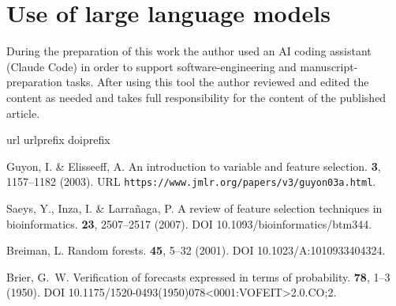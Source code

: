 \documentclass[fleqn,10pt]{wlscirep}
\begin{document}
\section*{Use of large language models}
During the preparation of this work the author used an AI coding assistant (Claude Code) in order to
support software-engineering and manuscript-preparation tasks. After using this tool the author
reviewed and edited the content as needed and takes full responsibility for the content of the
published article.

\begin{thebibliography}{10}
\expandafter\ifx\csname url\endcsname\relax
  \def\url#1{\texttt{#1}}\fi
\expandafter\ifx\csname urlprefix\endcsname\relax\def\urlprefix{URL }\fi
\expandafter\ifx\csname doiprefix\endcsname\relax\def\doiprefix{DOI }\fi
\providecommand{\bibinfo}[2]{#2}
\providecommand{\eprint}[2][]{\url{#2}}

\bibinfo{author}{Guyon, I.} \& \bibinfo{author}{Elisseeff, A.}
\newblock \bibinfo{journal}{\bibinfo{title}{An introduction to variable and
  feature selection}}.
  \textbf{\bibinfo{volume}{3}}, \bibinfo{pages}{1157--1182}
  (\bibinfo{year}{2003}).
\newblock \urlprefix\url{https://www.jmlr.org/papers/v3/guyon03a.html}.

\bibinfo{author}{Saeys, Y.}, \bibinfo{author}{Inza, I.} \&
  \bibinfo{author}{Larra{\~n}aga, P.}
\newblock \bibinfo{journal}{\bibinfo{title}{A review of feature selection
  techniques in bioinformatics}}.
 \textbf{\bibinfo{volume}{23}},
  \bibinfo{pages}{2507--2517} (\bibinfo{year}{2007}).
\newblock \doiprefix 10.1093/bioinformatics/btm344.

\bibinfo{author}{Breiman, L.}
\newblock \bibinfo{journal}{\bibinfo{title}{Random forests}}.
  \textbf{\bibinfo{volume}{45}}, \bibinfo{pages}{5--32} (\bibinfo{year}{2001}).
\newblock \doiprefix 10.1023/A:1010933404324.

\bibinfo{author}{Brier, G.~W.}
\newblock \bibinfo{journal}{\bibinfo{title}{Verification of forecasts expressed
  in terms of probability}}.
  \textbf{\bibinfo{volume}{78}}, \bibinfo{pages}{1--3} (\bibinfo{year}{1950}).
\newblock \doiprefix 10.1175/1520-0493(1950)078<0001:VOFEIT>2.0.CO;2.


\end{thebibliography}
\end{document}
